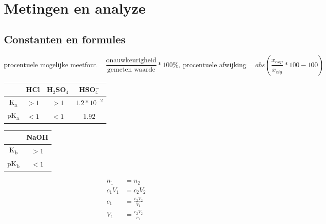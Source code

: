 \documentclass[10pt,twoside]{report}
\begin{document}
\newpage

\section{Metingen en analyze}
\subsection{Constanten en formules}
\begin{equation*}
        \text{procentuele mogelijke meetfout} = \frac{\text{onauwkeurigheid}}{\text{gemeten waarde}}*100\%,\ \text{procentuele afwijking} = abs(\frac{x_{exp}}{x_{eig}}*100-100)
\end{equation*}
\begin{tabular}{|c|c|c|c|}
    \hline
                        & HCl & H$_2$SO$_4$ & HSO$_4^-$ \\\hline
    K\textsubscript{a}  & $>1$ & $>1$ & $1.2*10^{-2}$ \\\hline
    pK\textsubscript{a} & $<1$ & $<1$ & $1.92$ \\\hline
\end{tabular}
\quad
\begin{tabular}{|c|c|}
    \hline
        & NaOH \\\hline
    K\textsubscript{b} & $>1$ \\\hline
    pK\textsubscript{b} & $<1$ \\\hline
\end{tabular}

\begin{equation*}
    \begin{split}
        n_1 &= n_2\\
        c_1V_1 &= c_2V_2\\
        c_1 &= \frac{c_2V_2}{V_1}\\
        V_1 &= \frac{c_2V_2}{c_1}\\
    \end{split}
\end{equation*}
\end{document}
